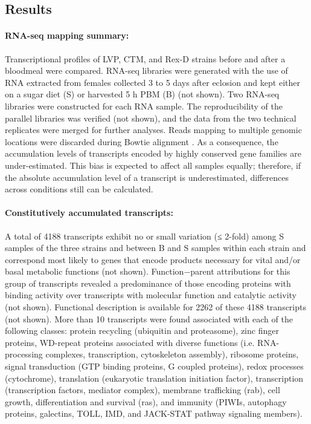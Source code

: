 \subsection{Results}
\paragraph*{RNA-seq mapping summary:}

Transcriptional profiles of \gls{LVP}, \gls{CTM}, and \gls{Rex-D} strains before and after a bloodmeal were compared.
RNA-seq libraries were generated with the use of RNA extracted from females collected 3 to 5 days after eclosion and kept either on a sugar diet (S) or harvested 5 h \gls{PBM} (B) (not shown).
Two RNA-seq libraries were constructed for each RNA sample.
The reproducibility of the parallel libraries was verified (not shown), and the data from the two technical replicates were merged for further analyses.
Reads mapping to multiple genomic locations were discarded during Bowtie alignment \cite{Langmead2009}.
As a consequence, the accumulation levels of transcripts encoded by highly conserved gene families are under-estimated.
This bias is expected to affect all samples equally; therefore, if the absolute accumulation level of a transcript is underestimated, differences across conditions still can be calculated.



\paragraph*{Constitutively accumulated transcripts:}

A total of 4188 transcripts exhibit no or small variation (≤ 2-fold) among S samples of the three strains and between B and S samples within each strain and correspond most likely to genes that encode products necessary for vital and/or basal metabolic functions (not shown).
Function−parent attributions for this group of transcripts revealed a predominance of those encoding proteins with binding activity over transcripts with molecular function and catalytic activity (not shown).
Functional description is available for 2262 of these 4188 transcripts \cite{Lawson2009} (not shown).
More than 10 transcripts were found associated with each of the following classes: protein recycling (ubiquitin and proteasome), zinc finger proteins, WD-repeat proteins associated with diverse functions (i.e. RNA-processing complexes, transcription, cytoskeleton assembly), ribosome proteins, signal transduction (GTP binding proteins, G coupled proteins), redox processes (cytochrome), translation (eukaryotic translation initiation factor), transcription (transcription factors, mediator complex), membrane trafficking (rab), cell growth, differentiation and survival (ras), and immunity (PIWIs, autophagy proteins, galectins, TOLL, IMD, and JACK-STAT pathway signaling members).


